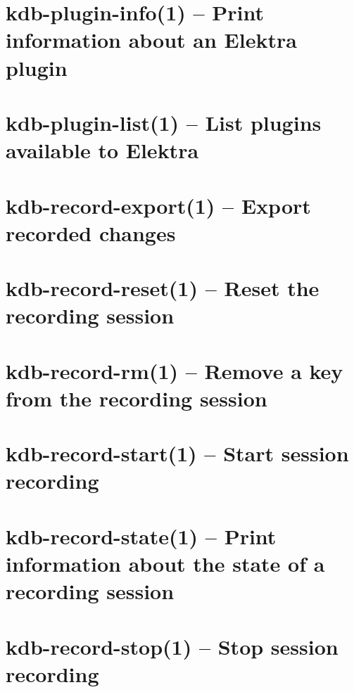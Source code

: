 \let\mypdfximage\pdfximage\def\pdfximage{\immediate\mypdfximage}\documentclass[twoside]{book}
\newcommand{\+}{\discretionary{\mbox{\scriptsize$\hookleftarrow$}}{}{}}
\begin{document}
\chapter{kdb-\/plugin-\/info(1) -- Print information about an Elektra plugin}
\label{doc_help_kdb-plugin-info_md}

\chapter{kdb-\/plugin-\/list(1) -- List plugins available to Elektra}
\label{doc_help_kdb-plugin-list_md}

\chapter{kdb-\/record-\/export(1) -- Export recorded changes}
\label{doc_help_kdb-record-export_md}

\chapter{kdb-\/record-\/reset(1) -- Reset the recording session}
\label{doc_help_kdb-record-reset_md}

\chapter{kdb-\/record-\/rm(1) -- Remove a key from the recording session}
\label{doc_help_kdb-record-rm_md}

\chapter{kdb-\/record-\/start(1) -- Start session recording}
\label{doc_help_kdb-record-start_md}

\chapter{kdb-\/record-\/state(1) -- Print information about the state of a recording session}
\label{doc_help_kdb-record-state_md}

\chapter{kdb-\/record-\/stop(1) -- Stop session recording}
\label{doc_help_kdb-record-stop_md}

\end{document}
